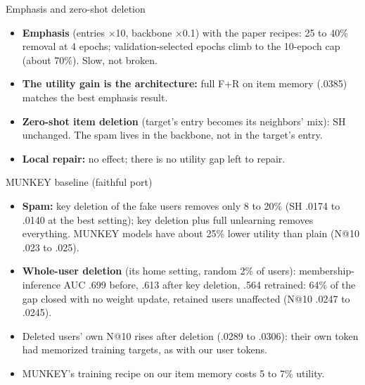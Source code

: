 \documentclass{beamer}
\begin{document}
\begin{frame}{Emphasis and zero-shot deletion}
\begin{itemize}
  \item \textbf{Emphasis} (entries $\times$10, backbone $\times$0.1) with the
        paper recipes: 25 to 40\% removal at 4 epochs; validation-selected
        epochs climb to the 10-epoch cap (about 70\%). Slow, not broken.
  \item \textbf{The utility gain is the architecture:} full F+R on item memory
        (.0385) matches the best emphasis result.
  \item \textbf{Zero-shot item deletion} (target's entry becomes its neighbors'
        mix): SH unchanged. The spam lives in the backbone, not in the target's
        entry.
  \item \textbf{Local repair:} no effect; there is no utility gap left to repair.
\end{itemize}
\end{frame}

\begin{frame}{MUNKEY baseline (faithful port)}
\begin{itemize}
  \item \textbf{Spam:} key deletion of the fake users removes only 8 to 20\%
        (SH .0174 to .0140 at the best setting); key deletion plus full
        unlearning removes everything. MUNKEY models have about 25\% lower
        utility than plain (N@10 .023 to .025).
  \item \textbf{Whole-user deletion} (its home setting, random 2\% of users):
        membership-inference AUC .699 before, .613 after key deletion, .564
        retrained: 64\% of the gap closed with no weight update, retained users
        unaffected (N@10 .0247 to .0245).
  \item Deleted users' own N@10 rises after deletion (.0289 to .0306): their own
        token had memorized training targets, as with our user tokens.
  \item MUNKEY's training recipe on our item memory costs 5 to 7\% utility.
\end{itemize}
\end{frame}
\end{document}
